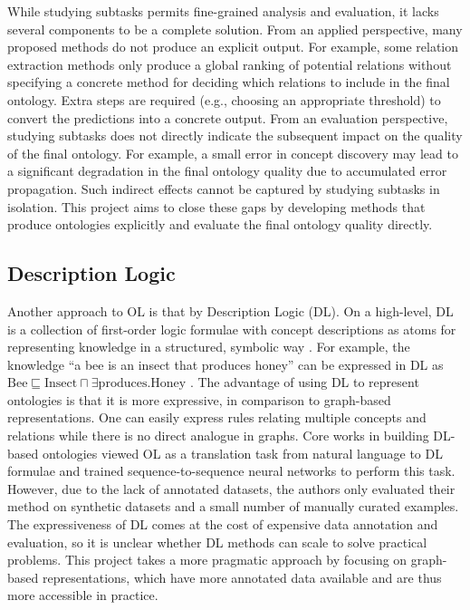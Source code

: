 While studying subtasks permits fine-grained analysis and evaluation, it lacks several components to be a complete solution. From an applied perspective, many proposed methods do not produce an explicit output. For example, some relation extraction methods only produce a global ranking of potential relations \cite{roller2018hearst} without specifying a concrete method for deciding which relations to include in the final ontology. Extra steps are required (e.g., choosing an appropriate threshold) to convert the predictions into a concrete output. From an evaluation perspective, studying subtasks does not directly indicate the subsequent impact on the quality of the final ontology. For example, a small error in concept discovery may lead to a significant degradation in the final ontology quality due to accumulated error propagation. Such indirect effects cannot be captured by studying subtasks in isolation. This project aims to close these gaps by developing methods that produce ontologies explicitly and evaluate the final ontology quality directly.

\subsection{Description Logic}

Another approach to OL is that by Description Logic (DL). On a high-level, DL is a collection of first-order logic formulae with concept descriptions as atoms for representing knowledge in a structured, symbolic way \cite{baader2017introduction}. For example, the knowledge ``a bee is an insect that produces honey'' can be expressed in DL as
    {
        \sffamily
        $\text{Bee} \sqsubseteq \text{Insect} \sqcap  \exists \text{produces}. \text{Honey}$
    }.
The advantage of using DL to represent ontologies is that it is more expressive, in comparison to graph-based representations. One can easily express rules relating multiple concepts and relations while there is no direct analogue in graphs. Core works in building DL-based ontologies viewed OL as a translation task from natural language to DL formulae \citet{petrucci2016ontology,petrucci2018expressive} and trained sequence-to-sequence neural networks to perform this task. However, due to the lack of annotated datasets, the authors only evaluated their method on synthetic datasets and a small number of manually curated examples. The expressiveness of DL comes at the cost of expensive data annotation and evaluation, so it is unclear whether DL methods can scale to solve practical problems. This project takes a more pragmatic approach by focusing on graph-based representations, which have more annotated data available and are thus more accessible in practice.

